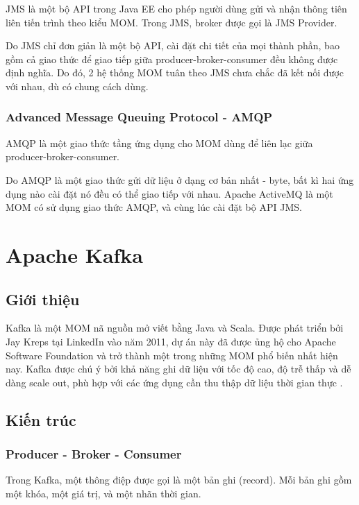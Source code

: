 \documentclass{article}
\begin{document}
JMS là một bộ API trong Java EE cho phép người dùng gửi và nhận thông tiên liên
tiến trình theo kiểu MOM. Trong JMS, broker được gọi là JMS Provider.

Do JMS chỉ đơn giản là một bộ API, cài đặt chi tiết của mọi thành phần, bao gồm
cả giao thức để giao tiếp giữa producer-broker-consumer đều không được định
nghĩa. Do đó, 2 hệ thống MOM tuân theo JMS chưa chắc đã kết nối được với nhau,
dù có chung cách dùng.

\subsubsection{Advanced Message Queuing Protocol - AMQP}

AMQP là một giao thức tầng ứng dụng cho MOM dùng để liên lạc giữa
producer-broker-consumer.

Do AMQP là một giao thức gửi dữ liệu ở dạng cơ bản nhất - byte, bất kì hai ứng
dụng nào cài đặt nó đều có thể giao tiếp với nhau. Apache ActiveMQ là một MOM có
sử dụng giao thức AMQP, và cùng lúc cài đặt bộ API JMS.

\section{Apache Kafka} \label{kafka}

\subsection{Giới thiệu}

Kafka là một MOM nã nguồn mở viết bằng Java và Scala. Được phát triển bởi Jay
Kreps tại LinkedIn vào năm 2011, dự án này đã được ủng hộ cho Apache Software
Foundation và trở thành một trong những MOM phổ biến nhất hiện nay. Kafka được
chú ý bởi khả năng ghi dữ liệu với tốc độ cao, độ trễ thấp và dễ dàng scale out,
phù hợp với các ứng dụng cần thu thập dữ liệu thời gian thực \cite{kafka_intro}.

\subsection{Kiến trúc}

\subsubsection{Producer - Broker - Consumer}

Trong Kafka, một thông điệp được gọi là một bản ghi (record). Mỗi bản ghi gồm
một khóa, một giá trị, và một nhãn thời gian.
\end{document}
